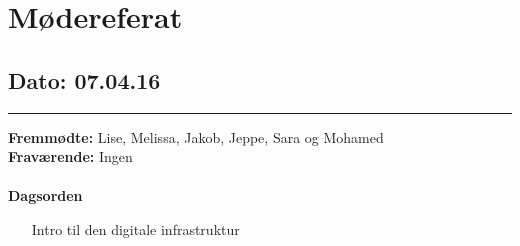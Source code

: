 \chapter{Mødereferat}

\section{Dato: 07.04.16}
\hrule
\textbf{Fremmødte:} Lise, Melissa, Jakob, Jeppe, Sara og Mohamed \\

\textbf{Fraværende:} Ingen
\\
\\
\textbf{Dagsorden}
\begin{itemize}
\item[Intro til den digitale infrastruktur]
\end{itemize}

